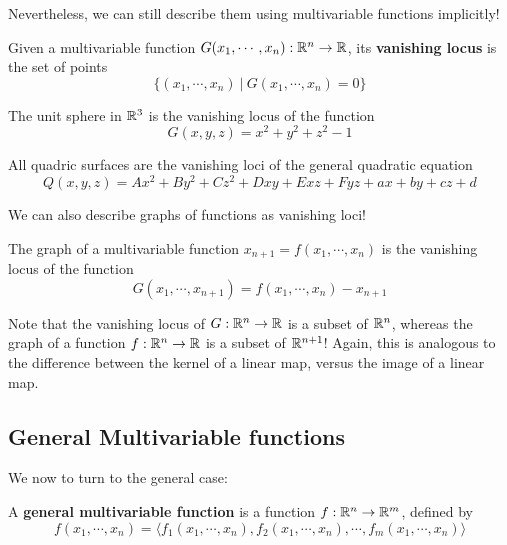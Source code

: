 Nevertheless, we can still describe them using multivariable functions implicitly!

\begin{definition}
Given a multivariable function $G(x_1, \cdots, x_n) : \mathbb{R}^n \to \mathbb{R}$, its \textbf{vanishing locus} is the set of points 
$$\{(x_1, \cdots, x_n) \ | \ G(x_1, \cdots, x_n) = 0\}$$
\end{definition}


\begin{example}
The unit sphere in $\mathbb{R}^3$ is the vanishing locus of the function $$G(x,y,z) = x^2 + y^2 +z^2-1$$
\end{example}

\begin{example}
All quadric surfaces are the vanishing loci of the general quadratic equation $$Q(x,y,z) = Ax^2 + By^2 + Cz^2 + Dxy + Exz + Fyz + ax + by + cz + d$$
\end{example}

We can also describe graphs of functions as vanishing loci!

\begin{example}
The graph of a multivariable function $x_{n+1}=f(x_1, \cdots, x_n)$ is the vanishing locus of the function $$G(x_1, \cdots, x_{n+1}) = f(x_1, \cdots, x_n) -x_{n+1}$$
\end{example}

Note that the vanishing locus of $G : \mathbb{R}^n \to \mathbb{R}$ is a subset of $\mathbb{R}^n$, whereas the graph of a function $f : \mathbb{R}^n \to \mathbb{R}$ is a subset of $\mathbb{R}^{n+1}$!  Again, this is analogous to the difference between the kernel of a linear map, versus the image of a linear map.






\subsection{General Multivariable functions}\label{generalmulti}

We now to turn to the general case:

\begin{definition}
A \textbf{general multivariable function} is a function $f : \mathbb{R}^n \to \mathbb{R}^m$, defined by 
$$f(x_1, \cdots, x_n) = \big\langle f_1(x_1, \cdots, x_n), f_2(x_1, \cdots, x_n), \cdots, f_m(x_1, \cdots, x_n) \big\rangle$$

\end{definition}

